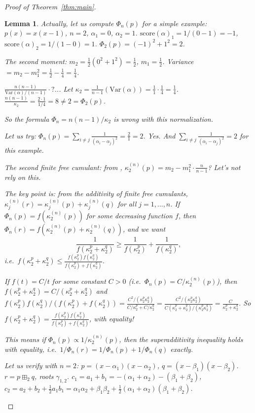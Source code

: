 \documentclass[12pt]{article}
\newtheorem{lemma}[theorem]{Lemma}
\theoremstyle{definition}
\newcommand{\score}{\mathrm{score}}
\begin{document}
\begin{proof}[Proof of Theorem~\ref{thm:main}]
\begin{lemma}
Actually, let us compute $\Phi_n(p)$ for a simple example: $p(x)=x(x-1)$, $n=2$, $\alpha_1=0$, $\alpha_2=1$.
$\score(\alpha)_1 = 1/(0-1)=-1$, $\score(\alpha)_2=1/(1-0)=1$.
$\Phi_2(p)=(-1)^2+1^2=2$.

The second moment: $m_2=\frac{1}{2}(0^2+1^2)=\frac{1}{2}$, $m_1=\frac{1}{2}$.
Variance $= m_2-m_1^2=\frac{1}{2}-\frac{1}{4}=\frac{1}{4}$.

$\frac{n(n-1)}{\text{Var}(\alpha)/(n-1)}\cdot?$... Let $\kappa_2=\frac{1}{n-1}(\text{Var}(\alpha))=\frac{1}{1}\cdot\frac{1}{4}=\frac{1}{4}$.
$\frac{n(n-1)}{\kappa_2}=\frac{2\cdot 1}{1/4}=8\neq 2=\Phi_2(p)$.

So the formula $\Phi_n=n(n-1)/\kappa_2$ is wrong with this normalization.

Let us try: $\Phi_n(p)=\sum_{i\neq j}\frac{1}{(\alpha_i-\alpha_j)^2}=\frac{2}{1}=2$. Yes.
And $\sum_{i\neq j}\frac{1}{(\alpha_i-\alpha_j)^2}=2$ for this example.

The second finite free cumulant: from \cite{AP18}, $\kappa_2^{(n)}(p)=m_2-m_1^2\cdot\frac{n}{n-1}$? Let's not rely on this.

The key point is: from the additivity of finite free cumulants,
$\kappa_j^{(n)}(r)=\kappa_j^{(n)}(p)+\kappa_j^{(n)}(q)$ for all $j=1,\ldots,n$.
If $\Phi_n(p)=f(\kappa_2^{(n)}(p))$ for some decreasing function $f$, then
$\Phi_n(r)=f(\kappa_2^{(n)}(p)+\kappa_2^{(n)}(q))$, and we want
\[
  \frac{1}{f(\kappa_2^p+\kappa_2^q)}\ge\frac{1}{f(\kappa_2^p)}+\frac{1}{f(\kappa_2^q)},
\]
i.e.\ $f(\kappa_2^p+\kappa_2^q)\le\frac{f(\kappa_2^p)f(\kappa_2^q)}{f(\kappa_2^p)+f(\kappa_2^q)}$.

If $f(t)=C/t$ for some constant $C>0$ (i.e.\ $\Phi_n(p)=C/\kappa_2^{(n)}(p)$), then
$f(\kappa_2^p+\kappa_2^q)=C/(\kappa_2^p+\kappa_2^q)$ and $f(\kappa_2^p)f(\kappa_2^q)/(f(\kappa_2^p)+f(\kappa_2^q))
=\frac{C^2/(\kappa_2^p\kappa_2^q)}{C/\kappa_2^p+C/\kappa_2^q}=\frac{C^2/(\kappa_2^p\kappa_2^q)}{C(\kappa_2^p+\kappa_2^q)/(\kappa_2^p\kappa_2^q)}=\frac{C}{\kappa_2^p+\kappa_2^q}$.
So $f(\kappa_2^p+\kappa_2^q)=\frac{f(\kappa_2^p)f(\kappa_2^q)}{f(\kappa_2^p)+f(\kappa_2^q)}$, with \emph{equality}!

This means if $\Phi_n(p)\propto 1/\kappa_2^{(n)}(p)$, then the superadditivity inequality holds with equality, i.e.\ $1/\Phi_n(r)=1/\Phi_n(p)+1/\Phi_n(q)$ exactly.

Let us verify with $n=2$: $p=(x-\alpha_1)(x-\alpha_2)$, $q=(x-\beta_1)(x-\beta_2)$.
$r=p\boxplus_2 q$, roots $\gamma_{1,2}$.
$c_1=a_1+b_1=-(\alpha_1+\alpha_2)-(\beta_1+\beta_2)$, $c_2=a_2+b_2+\frac{1}{2}a_1b_1=\alpha_1\alpha_2+\beta_1\beta_2+\frac{1}{2}(\alpha_1+\alpha_2)(\beta_1+\beta_2)$.


\end{lemma}
\end{proof}
\end{document}
